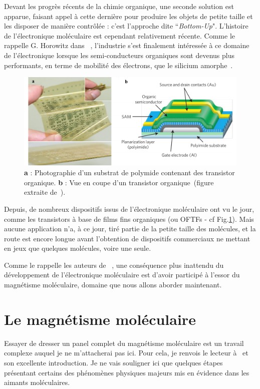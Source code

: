 Devant les progrès récents de la chimie organique, une seconde solution est apparue, faisant appel à cette dernière  pour produire les objets de petite taille et les disposer de manière contrôlée : c'est l'approche dite ``\textit{Bottom-Up}". L'histoire de l'électronique moléculaire est cependant relativement récente. Comme le rappelle G. Horowitz dans~\cite{Klauk2007} , l'industrie s'est finalement intéressée à ce domaine de l'électronique lorsque les semi-conducteurs organiques sont devenus plus performants, en terme de mobilité des électrons, que le silicium amorphe~\cite{Lin1997}.
\begin{figure}
\centering \includegraphics[scale=0.45]{Spintronique/MolecularElec/MolecularElec.pdf}
\caption{\textbf{a} : Photographie d'un substrat de polymide contenant des transistor organique. \textbf{b} : Vue en coupe d'un transistor organique~(figure extraite de~\cite{Sekitani2010}).}
\label{MolecularElec}
\end{figure}


Depuis, de nombreux dispositifs issus de l'électronique moléculaire ont vu le jour, comme les  transistors à base de films fins organiques (ou OFTFs - cf Fig.\ref{MolecularElec}). Mais aucune application n'a, à ce jour, tiré partie de la petite taille des molécules, et la route est encore longue avant l'obtention de dispositifs commerciaux ne mettant en jeux que quelques molécules, voire une seule.

Comme le rappelle les auteurs de~\cite{Gatteschi2006} , une conséquence plus inattendu du développement de l'électronique moléculaire est d'avoir participé à l'essor du magnétisme moléculaire, domaine que nous allons aborder maintenant.


\section{Le magnétisme moléculaire}
Essayer de dresser un panel complet du magnétisme moléculaire est un travail complexe auquel je ne m'attacherai pas ici. Pour cela, je renvois le lecteur à~\cite{Gatteschi2006} et son excellente introduction. Je ne vais souligner ici que quelques étapes présentant certains des phénomènes physiques majeurs mis en évidence dans les aimants moléculaires.

